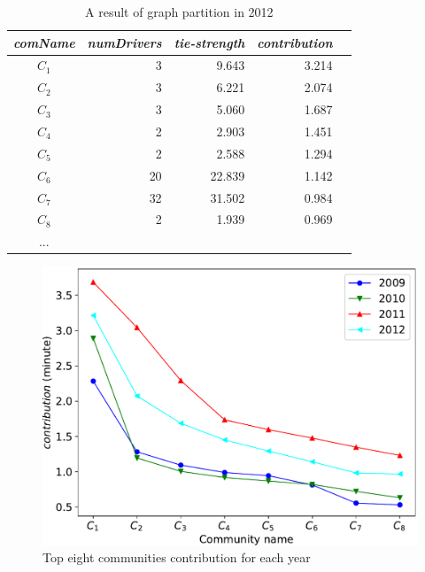 \documentclass{article}
\begin{document}
\begin{table}[h]
	\caption{A result of graph partition in 2012}
	\vspace{-0.3 cm}
	\begin{center}
		\begin{tabular}{c|rrrr}
		  	\emph{comName} 	& \multicolumn{1}{c}{\emph{numDrivers} }	& \multicolumn{1}{c}{\emph{tie-strength}}	& \multicolumn{1}{c}{\emph{contribution}} \\
		  \hline
			$C_1$ 	& 3 		& 9.643 	& 3.214 \\
			$C_2$ 	& 3 		& 6.221 	& 2.074 \\
			$C_3$ 	& 3 		& 5.060 	& 1.687 \\
			$C_4$ 	& 2 		& 2.903 	& 1.451 \\
			$C_5$ 	& 2 		& 2.588 	& 1.294 \\
			$C_6$ 	& 20	& 22.839 & 1.142 \\
			$C_7$ 	& 32 	& 31.502 & 0.984 \\
			$C_8$ 	& 2 		& 1.939 	& 0.969 \\
			... & & &
		\end{tabular}
	\label{tab:partitionResult}
	\end{center}
	\vspace{-0.3 cm}
\end{table}


\begin{figure} [h]
  \centering
  \includegraphics[width=.9\linewidth]{figs/yearContribution}
  \caption{Top eight communities contribution for each year}
  \label{fig:yearContribution}
\end{figure}

\end{document}
